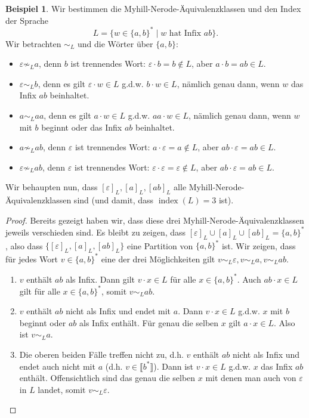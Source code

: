 \documentclass[11pt, a4paper]{article}
\theoremstyle{definition}
\newtheorem{example}[definition]{Beispiel}
\theoremstyle{plain}
\numberwithin{equation}{section}
\DeclareMathOperator{\ind}{index}
\begin{document}
\begin{example}\label{exp:ex4}
	Wir bestimmen die Myhill-Nerode-Äquivalenzklassen und den Index der Sprache 
	$$
		L = \{w \in \{a, b\}^\ast \mid w \text{ hat Infix } ab\}.
	$$
	Wir betrachten $\sim_L$ und die Wörter über $\{a, b\}$:
	\begin{itemize}
		\item $\varepsilon \not\sim_L a$, denn $b$ ist trennendes Wort: $\varepsilon \cdot b = b \notin L$, aber $a \cdot b = ab \in L$.
		\item $\varepsilon \sim_L b$, denn es gilt $\varepsilon \cdot w \in L$  g.d.w. $b \cdot w \in L$, nämlich genau dann, wenn $w$ das Infix $ab$ beinhaltet.
		\item $a \sim_L aa$, denn es gilt $a \cdot w \in L$ g.d.w. $aa \cdot w \in L$, nämlich genau dann, wenn $w$ mit $b$ beginnt oder das Infix $ab$ beinhaltet.
		\item $a \not\sim_L ab$, denn $\varepsilon$ ist trennendes Wort: $a \cdot \varepsilon = a \notin L$, aber $ab \cdot \varepsilon = ab \in L$.
		\item $\varepsilon \not\sim_L ab$, denn $\varepsilon$ ist trennendes Wort: $\varepsilon \cdot \varepsilon = \varepsilon \notin L$, aber $ab \cdot \varepsilon = ab \in L$.
	\end{itemize}
	Wir behaupten nun, dass $[\varepsilon]_L, [a]_L, [ab]_L$ alle Myhill-Nerode-Äquivalenzklassen sind (und damit, dass $\ind(L) = 3$ ist).
	\begin{proof}
		Bereits gezeigt haben wir, dass diese drei Myhill-Nerode-Äquivalenzklassen jeweils verschieden sind. Es bleibt zu zeigen, dass $[\varepsilon]_L \cup [a]_L \cup [ab]_L = \{a, b\}^\ast$, also dass $\{[\varepsilon]_L, [a]_L, [ab]_L\}$ eine Partition von $\{a, b\}^\ast$ ist. Wir zeigen, dass für jedes Wort $v \in \{a, b\}^\ast$ eine der drei Möglichkeiten gilt $v \sim_L \varepsilon, v \sim_L a, v \sim_L ab$.
		\begin{enumerate}[label=\arabic*)]
			\item $v$ enthält $ab$ als Infix. Dann gilt $v \cdot x \in L$ für alle $x \in\{a, b\}^\ast$. Auch $ab \cdot x \in L$ gilt für alle $x \in \{a, b\}^\ast$, somit $v \sim_L ab$.
			\item $v$ enthält $ab$ nicht als Infix und endet mit $a$. Dann $v \cdot x \in L$ g.d.w. $x$ mit $b$ beginnt oder $ab$ als Infix enthält. Für genau die selben $x$ gilt $a \cdot x \in L$. Also ist $v \sim_L a$.
			\item Die oberen beiden Fälle treffen nicht zu, d.h. $v$ enthält $ab$ nicht als Infix und endet auch nicht mit $a$ (d.h. $v \in \llbracket b^\ast \rrbracket$). Dann ist $v \cdot x \in L$ g.d.w. $x$ das Infix $ab$ enthält. Offensichtlich sind das genau die selben $x$ mit denen man auch von $\varepsilon$ in $L$ landet, somit $v \sim_L \varepsilon$.

\end{enumerate}
\end{proof}
\end{example}
\end{document}
